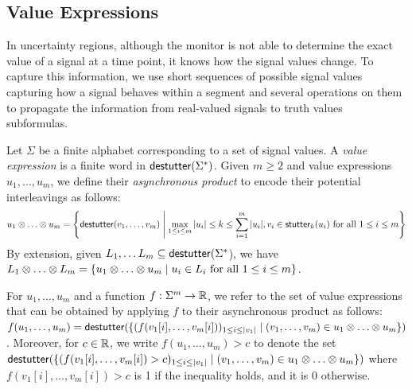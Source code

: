\subsection{Value Expressions}
In uncertainty regions, although the monitor is not able to determine the exact value of a signal at a time point, it knows how the signal values change.
To capture this information, we use short sequences of possible signal values capturing how a signal behaves within a segment and several operations on them to propagate the information from real-valued signals to truth values subformulas.

Let $\Sigma$ be a finite alphabet corresponding to a set of signal values.
A \emph{value expression} is a finite word in $\mathsf{destutter}(\Sigma^*)$.
Given $m \geq 2$ and value expressions $u_1, \ldots, u_m$, we define their \emph{asynchronous product} to encode their potential interleavings as follows:
\small
$$u_1 \otimes \ldots \otimes u_m = \left\lbrace  \destutter(v_1, \ldots, v_m) \st \max_{1 \leq i \leq m} |u_i| \leq k \leq \sum_{i = 1}^{m} |u_i|, v_i \in \stutter_k(u_i) \text{ for all } 1 \leq i \leq m \right\rbrace$$  
\normalsize
By extension, given $L_1, \ldots L_m \subseteq \mathsf{destutter}(\Sigma^*$), we have $L_1 \otimes \ldots \otimes L_m = \{ u_1 \otimes \ldots \otimes u_m \st u_i \in L_i \text{ for all } 1 \leq i \leq m\}$.

For $u_1, \ldots, u_m$ and a function $f : \Sigma^m \to \mathbb{R}$, we refer to the set of value expressions that can be obtained by applying $f$ to their asynchronous product as follows: $f(u_1, \ldots, u_m) = \destutter(\{(f(v_1[i], \ldots, v_m[i]))_{1 \leq i \leq |v_1|} \st (v_1, \ldots, v_m) \in u_1 \otimes \ldots \otimes u_m\})$.
Moreover, for $c \in \mathbb{R}$, we write $f(u_1, \ldots, u_m) > c$ to denote the set $\destutter(\{(f(v_1[i], \ldots, v_m[i]) > c)_{1 \leq i \leq |v_1|} \st (v_1, \ldots, v_m) \in u_1 \otimes \ldots \otimes u_m\})$ where $f(v_1[i], \ldots, v_m[i]) > c$ is 1 if the inequality holds, and it is 0 otherwise.

